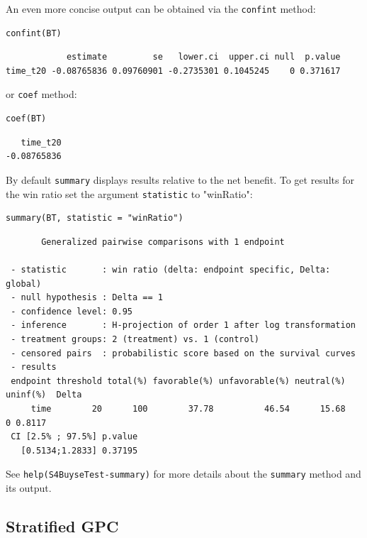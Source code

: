 \documentclass[12pt]{article}
\begin{document}
\bigskip

An even more concise output can be obtained via the \texttt{confint} method:
\lstset{language=r,label= ,caption= ,captionpos=b,numbers=none}
\begin{lstlisting}
confint(BT)
\end{lstlisting}

\begin{verbatim}
            estimate         se   lower.ci  upper.ci null  p.value
time_t20 -0.08765836 0.09760901 -0.2735301 0.1045245    0 0.371617
\end{verbatim}


or \texttt{coef} method:
\lstset{language=r,label= ,caption= ,captionpos=b,numbers=none}
\begin{lstlisting}
coef(BT)
\end{lstlisting}

\begin{verbatim}
   time_t20 
-0.08765836
\end{verbatim}


By default \texttt{summary} displays results relative to the net benefit. To
get results for the win ratio set the argument \texttt{statistic} to
"winRatio":
\lstset{language=r,label= ,caption= ,captionpos=b,numbers=none}
\begin{lstlisting}
summary(BT, statistic = "winRatio")
\end{lstlisting}

\begin{verbatim}
       Generalized pairwise comparisons with 1 endpoint

 - statistic       : win ratio (delta: endpoint specific, Delta: global) 
 - null hypothesis : Delta == 1 
 - confidence level: 0.95 
 - inference       : H-projection of order 1 after log transformation 
 - treatment groups: 2 (treatment) vs. 1 (control) 
 - censored pairs  : probabilistic score based on the survival curves
 - results
 endpoint threshold total(%) favorable(%) unfavorable(%) neutral(%) uninf(%)  Delta
     time        20      100        37.78          46.54      15.68        0 0.8117
 CI [2.5% ; 97.5%] p.value 
   [0.5134;1.2833] 0.37195
\end{verbatim}

See \texttt{help(S4BuyseTest-summary)} for more details about the \texttt{summary}
method and its output.

\clearpage

\subsection{Stratified GPC}
\label{sec:org7ce1c98}
\end{document}
